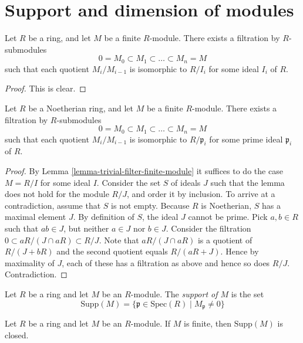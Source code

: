 \section{Support and dimension of modules}
\label{section-support}

\begin{lemma}
\label{lemma-trivial-filter-finite-module}
Let $R$ be a ring, and let $M$ be a finite $R$-module.
There exists a filtration by $R$-submodules
$$
0 = M_0 \subset M_1 \subset \ldots \subset M_n = M
$$
such that each quotient $M_i/M_{i-1}$ is isomorphic
to $R/I_i$ for some ideal $I_i$ of $R$.
\end{lemma}

\begin{proof}
This is clear.
\end{proof}

\begin{lemma}
\label{lemma-filter-Noetherian-module}
Let $R$ be a Noetherian ring, and let $M$ be a finite $R$-module.
There exists a filtration by $R$-submodules
$$
0 = M_0 \subset M_1 \subset \ldots \subset M_n = M
$$
such that each quotient $M_i/M_{i-1}$ is isomorphic
to $R/\mathfrak p_i$ for some prime ideal $\mathfrak p_i$
of $R$.
\end{lemma}

\begin{proof}
By Lemma \ref{lemma-trivial-filter-finite-module}
it suffices to do the case $M=R/I$ for some ideal $I$.
Consider the set $S$ of ideals $J$ such that the lemma
does not hold for the module $R/J$, and order it by
inclusion. To arrive at a
contradiction, assume that $S$ is not empty. Because
$R$ is Noetherian, $S$ has a maximal element $J$.
By definition of $S$, the ideal $J$ cannot be prime.
Pick $a,b\in R$ such that $ab \in J$, but neither
$a \in J$ nor $b\in J$. Consider the filtration
$0 \subset aR/(J \cap aR) \subset R/J$.
Note that $aR/(J \cap aR)$ is a quotient of $R/(J + bR)$
and the second quotient equals $R/(aR + J)$. Hence by 
maximality of $J$, each of these has a filtration as
above and hence so does $R/J$. Contradiction.
\end{proof}

\begin{definition}
\label{definition-support-module}
Let $R$ be a ring and let $M$ be an $R$-module.
The {\it support of $M$} is the set
$$
\text{Supp}(M)
=
\{
\mathfrak p \in \text{Spec}(R)
\mid 
M_{\mathfrak p} \not= 0
\}
$$
\end{definition}

\begin{lemma}
\label{lemma-support-closed}
Let $R$ be a ring and let $M$ be an $R$-module.
If $M$ is finite, then $\text{Supp}(M)$ is closed.
\end{lemma}

